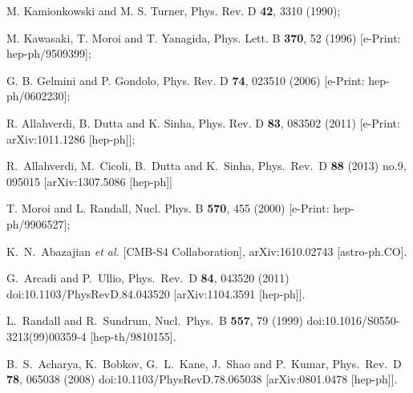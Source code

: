 \documentclass[12pt]{article}
\numberwithin{equation}{section}
\begin{document}
\begin{thebibliography}{99}
%
M. Kamionkowski and M. S. Turner, Phys. Rev. D {\bf 42}, 3310 (1990);

%
M. Kawasaki, T. Moroi and T. Yanagida, Phys. Lett. B {\bf 370}, 52 (1996) [e-Print: hep-ph/9509399];

%
G. B. Gelmini and P. Gondolo, Phys. Rev. D {\bf 74}, 023510 (2006) [e-Print: hep-ph/0602230];

%
R. Allahverdi, B. Dutta and K. Sinha, Phys. Rev. D {\bf 83}, 083502 (2011) [e-Print: arXiv:1011.1286 [hep-ph]];

%
  R.~Allahverdi, M.~Cicoli, B.~Dutta and K.~Sinha,
  Phys.\ Rev.\ D {\bf 88} (2013) no.9,  095015
  [arXiv:1307.5086 [hep-ph]]

%
T. Moroi and L. Randall, Nucl. Phys. B {\bf 570}, 455 (2000) [e-Print: hep-ph/9906527]; 
%

  
  K.~N.~Abazajian {\it et al.} [CMB-S4 Collaboration],
  arXiv:1610.02743 [astro-ph.CO].
  
  
  G.~Arcadi and P.~Ullio,
  Phys.\ Rev.\ D {\bf 84}, 043520 (2011)
  doi:10.1103/PhysRevD.84.043520
  [arXiv:1104.3591 [hep-ph]].
  
  L.~Randall and R.~Sundrum,
  Nucl.\ Phys.\ B {\bf 557}, 79 (1999)
  doi:10.1016/S0550-3213(99)00359-4
  [hep-th/9810155].
  
  
  B.~S.~Acharya, K.~Bobkov, G.~L.~Kane, J.~Shao and P.~Kumar,
  Phys.\ Rev.\ D {\bf 78}, 065038 (2008)
  doi:10.1103/PhysRevD.78.065038
  [arXiv:0801.0478 [hep-ph]].
  
  
\end{thebibliography}
\end{document}
